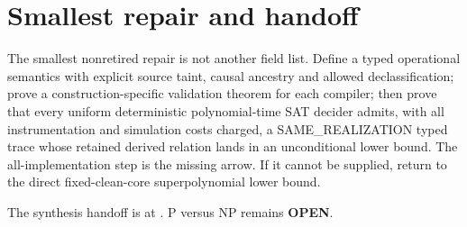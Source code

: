 \documentclass[11pt]{article}
\newcommand{\OPEN}{\textbf{OPEN}}
\begin{document}
\section{Smallest repair and handoff}

The smallest nonretired repair is not another field list.  Define a typed
operational semantics with explicit source taint, causal ancestry and allowed
declassification; prove a construction-specific validation theorem for each
compiler; then prove that every uniform deterministic polynomial-time SAT
decider admits, with all instrumentation and simulation costs charged, a
SAME\_REALIZATION typed trace whose retained derived relation lands in an
unconditional lower bound.  The all-implementation step is the missing
arrow.  If it cannot be supplied, return to the direct fixed-clean-core
superpolynomial lower bound.

The synthesis handoff is at
.
P versus NP remains \OPEN.

\end{document}
